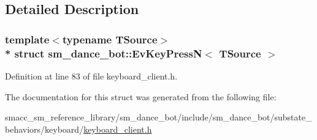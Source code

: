 \subsection{Detailed Description}
\subsubsection*{template$<$typename T\+Source$>$\\*
struct sm\+\_\+dance\+\_\+bot\+::\+Ev\+Key\+Press\+N$<$ T\+Source $>$}



Definition at line 83 of file keyboard\+\_\+client.\+h.



The documentation for this struct was generated from the following file\+:\begin{DoxyCompactItemize}
\item 
smacc\+\_\+sm\+\_\+reference\+\_\+library/sm\+\_\+dance\+\_\+bot/include/sm\+\_\+dance\+\_\+bot/substate\+\_\+behaviors/keyboard/\hyperlink{keyboard__client_8h}{keyboard\+\_\+client.\+h}\end{DoxyCompactItemize}
